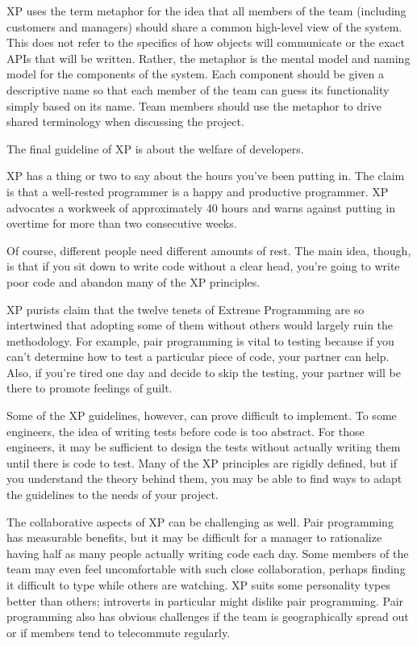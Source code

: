 
XP uses the term metaphor for the idea that all members of the team (including customers and managers) should share a common high-level view of the system. This does not refer to the specifics of how objects will communicate or the exact APIs that will be written. Rather, the metaphor is the mental model and naming model for the components of the system. Each component should be given a descriptive name so that each member of the team can guess its functionality simply based on its name. Team members should use the metaphor to drive shared terminology when discussing the project.


The final guideline of XP is about the welfare of developers.


XP has a thing or two to say about the hours you’ve been putting in. The claim is that a well-rested programmer is a happy and productive programmer. XP advocates a workweek of approximately 40 hours and warns against putting in overtime for more than two consecutive weeks.

Of course, different people need different amounts of rest. The main idea, though, is that if you sit down to write code without a clear head, you’re going to write poor code and abandon many of the XP principles.


XP purists claim that the twelve tenets of Extreme Programming are so intertwined that adopting some of them without others would largely ruin the methodology. For example, pair programming is vital to testing because if you can’t determine how to test a particular piece of code, your partner can help. Also, if you’re tired one day and decide to skip the testing, your partner will be there to promote feelings of guilt.

Some of the XP guidelines, however, can prove difficult to implement. To some engineers, the idea of writing tests before code is too abstract. For those engineers, it may be sufficient to design the tests without actually writing them until there is code to test. Many of the XP principles are rigidly defined, but if you understand the theory behind them, you may be able to find ways to adapt the guidelines to the needs of your project.

The collaborative aspects of XP can be challenging as well. Pair programming has measurable benefits, but it may be difficult for a manager to rationalize having half as many people actually writing code each day. Some members of the team may even feel uncomfortable with such close collaboration, perhaps finding it difficult to type while others are watching. XP suits some personality types better than others; introverts in particular might dislike pair programming. Pair programming also has obvious challenges if the team is geographically spread out or if members tend to telecommute regularly.


